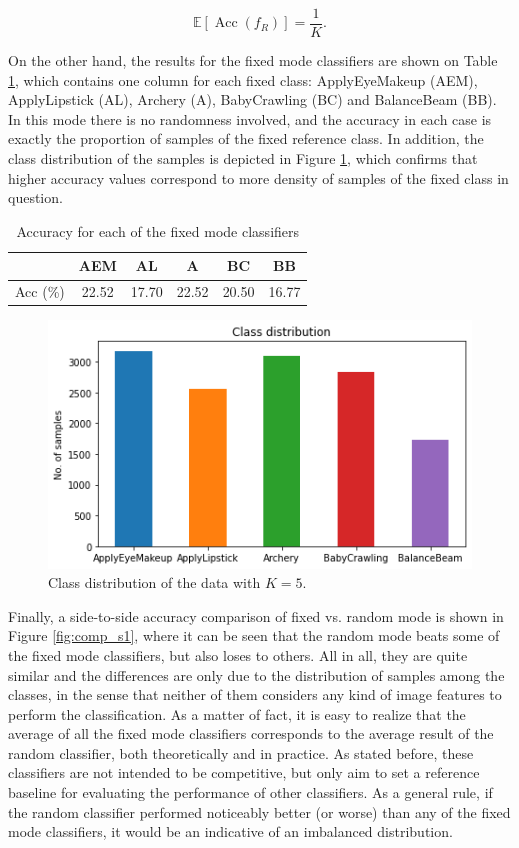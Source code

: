 \documentclass[letterpaper, 10 pt, conference]{IEEEtran}
\begin{document}
\begin{equation}
  \label{eq:expectation}
\mathbb E\left[\operatorname{Acc}(f_R)\right] = \frac{1}{K}.
\end{equation}

On the other hand, the results for the fixed mode classifiers are shown on Table \ref{tab:fixed}, which contains one column for each fixed class: ApplyEyeMakeup (AEM), ApplyLipstick (AL), Archery (A), BabyCrawling (BC) and BalanceBeam (BB). In this mode there is no randomness involved, and the accuracy in each case is exactly the proportion of samples of the fixed reference class. In addition, the class distribution of the samples is depicted in Figure \ref{fig:class_dist}, which confirms that higher accuracy values correspond to more density of samples of the fixed class in question.

\begin{table}[h!]
  \centering
  \begin{tabular}{c|ccccc}
    & AEM & AL & A & BC & BB\\
    \hline
    Acc (\%) & 22.52 & 17.70 & 22.52 & 20.50 & 16.77
  \end{tabular}\vspace{1em}
  \caption{Accuracy for each of the fixed mode classifiers}
  \label{tab:fixed}
\end{table}

\begin{figure}[h!]
  \centering
  \includegraphics[width=.4\textwidth]{img/s1_class_distribution}
  \vspace{-.5em}
  \caption{Class distribution of the data with $K=5$.}
  \label{fig:class_dist}
\end{figure}

Finally, a side-to-side accuracy comparison of fixed vs. random mode is shown in Figure \ref{fig:comp_s1}, where it can be seen that the random mode beats some of the fixed mode classifiers, but also loses to others. All in all, they are quite similar and the differences are only due to the distribution of samples among the classes, in the sense that neither of them considers any kind of image features to perform the classification. As a matter of fact, it is easy to realize that the average of all the fixed mode classifiers corresponds to the average result of the random classifier, both theoretically and in practice. As stated before, these classifiers are not intended to be competitive, but only aim to set a reference baseline for evaluating the performance of other classifiers. As a general rule, if the random classifier performed noticeably better (or worse) than any of the fixed mode classifiers, it would be an indicative of an imbalanced distribution.
\end{document}
